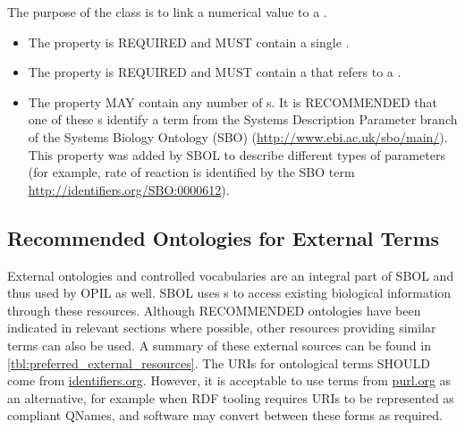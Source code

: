 The purpose of the  class is to link a numerical value to a . 

\begin{itemize}
\item \label{sec:om:hasNumericalValue}
The  property is REQUIRED and MUST contain a single .

\item \label{sec:om:hasUnit:Measure}
The  property is REQUIRED and MUST contain a  that refers to a . 

\item \label{sec:sbol:type:Measure}
The  property MAY contain any number of s. It is RECOMMENDED that one of these s identify a term from the Systems Description Parameter branch of the Systems Biology Ontology (SBO) (\url{http://www.ebi.ac.uk/sbo/main/}). This  property was added by SBOL to describe different types of parameters 
(for example, rate of reaction is identified by the SBO term \url{http://identifiers.org/SBO:0000612}).
\end{itemize}

\subsection{Recommended Ontologies for External Terms}
\label{sec:recomm_ontologies}

External ontologies and controlled vocabularies are an integral part of SBOL and thus used by OPIL as well. SBOL uses s to access existing biological information through these resources. 
Although RECOMMENDED ontologies have been indicated in relevant sections where possible, other resources providing similar terms can also be used. A summary of these external sources can be found in \ref{tbl:preferred_external_resources}.
The URIs for ontological terms SHOULD come from \url{identifiers.org}.  However, it is acceptable to use terms from \url{purl.org} as an alternative, for example when RDF tooling requires URIs to be represented as compliant QNames, and software may convert between these forms as required.

